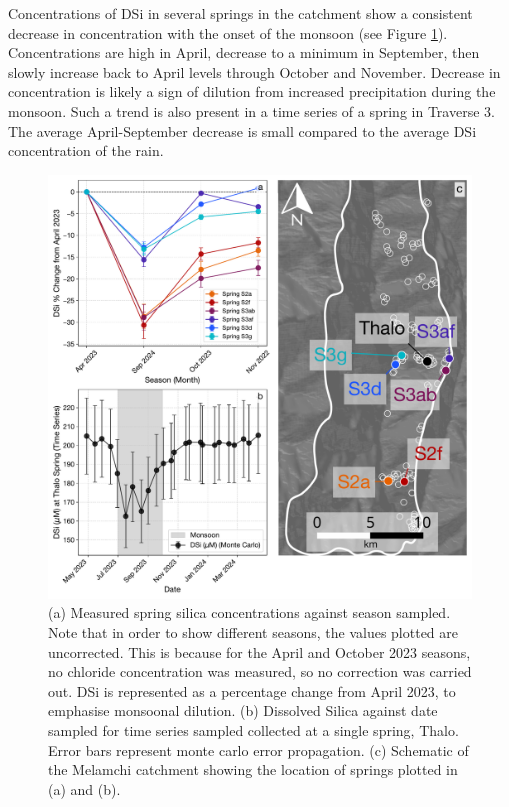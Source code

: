 Concentrations of DSi in several springs in the catchment show a consistent decrease in concentration with the onset of the monsoon (see Figure \ref{fig:time_series_changes}). Concentrations are high in April, decrease to a minimum in September, then slowly increase back to April levels through October and November. Decrease in concentration is likely a sign of dilution from increased precipitation during the monsoon. Such a trend is also present in a time series of a spring in Traverse 3. The average April-September decrease is small compared to the average DSi concentration of the rain.


\begin{figure}[h]
    \centering
    \includegraphics[width=\textwidth]{Combined_Si_mM_Plots_with_Schematic.pdf}
    \caption{(a) Measured spring silica concentrations against season sampled. Note that in order to show different seasons, the values plotted are uncorrected. This is because for the April and October 2023 seasons, no chloride concentration was measured, so no correction was carried out. DSi is represented as a percentage change from April 2023, to emphasise monsoonal dilution. (b) Dissolved Silica against date sampled for time series sampled collected at a single spring, Thalo. Error bars represent monte carlo error propagation. (c) Schematic of the Melamchi catchment showing the location of springs plotted in (a) and (b).}
    \label{fig:time_series_changes}
\end{figure}

